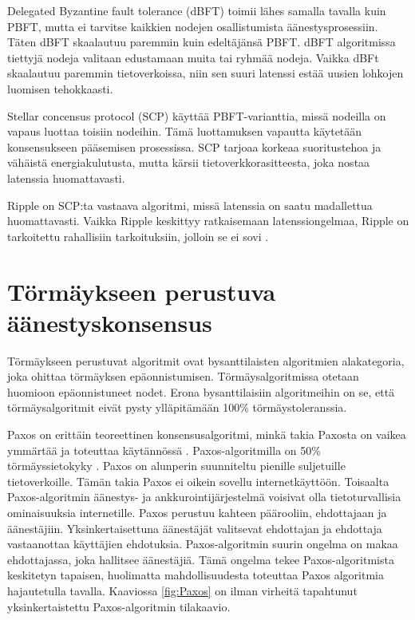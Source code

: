 \documentclass[utf8,bachelor]{gradu3}
\begin{document}
Delegated Byzantine fault tolerance (dBFT) toimii lähes samalla tavalla kuin PBFT, mutta ei tarvitse kaikkien nodejen osallistumista äänestysprosessiin. Täten dBFT skaalautuu paremmin kuin edeltäjänsä PBFT.
dBFT algoritmissa tiettyjä nodeja valitaan edustamaan muita tai ryhmää nodeja.
Vaikka dBFt skaalautuu paremmin tietoverkoissa, niin sen suuri latenssi estää uusien lohkojen luomisen tehokkaasti.

Stellar concensus protocol (SCP) käyttää PBFT-varianttia, missä nodeilla on vapaus luottaa toisiin nodeihin. Tämä luottamuksen vapautta käytetään konsensukseen pääsemisen prosessissa.
SCP tarjoaa korkeaa suoritustehoa ja vähäistä energiakulutusta, mutta kärsii tietoverkkorasitteesta, joka nostaa latenssia huomattavasti. 

Ripple on SCP:ta vastaava algoritmi, missä latenssia on saatu madallettua huomattavasti. Vaikka Ripple keskittyy ratkaisemaan latenssiongelmaa, Ripple on tarkoitettu rahallisiin tarkoituksiin, jolloin se ei sovi .

\section{Törmäykseen perustuva äänestyskonsensus}

Törmäykseen perustuvat algoritmit ovat bysanttilaisten algoritmien alakategoria, joka ohittaa törmäyksen epäonnistumisen. Törmäysalgoritmissa otetaan huomioon epäonnistuneet nodet. Erona bysanttilaisiin algoritmeihin on se, että törmäysalgoritmit eivät pysty ylläpitämään 100\% törmäystoleranssia.

Paxos on erittäin teoreettinen konsensusalgoritmi, minkä takia Paxosta on vaikea ymmärtää ja toteuttaa käytännössä \parencite{andrey2019review}.
Paxos-algoritmilla on 50\% törmäyssietokyky \parencite{panda2019study}.
Paxos on alunperin suunniteltu pienille suljetuille tietoverkoille. Tämän takia Paxos ei oikein sovellu internetkäyttöön.
Toisaalta Paxos-algoritmin äänestys- ja ankkurointijärjestelmä voisivat olla tietoturvallisia ominaisuuksia internetille. 
Paxos perustuu kahteen päärooliin, ehdottajaan ja äänestäjiin. Yksinkertaisettuna äänestäjät valitsevat ehdottajan ja ehdottaja vastaanottaa käyttäjien ehdotuksia.
Paxos-algoritmin suurin ongelma on makaa ehdottajassa, joka hallitsee äänestäjiä. Tämä ongelma tekee Paxos-algoritmista keskitetyn tapaisen, huolimatta mahdollisuudesta toteuttaa Paxos algoritmia hajautetulla tavalla. Kaaviossa \ref{fig:Paxos} on ilman virheitä tapahtunut yksinkertaistettu Paxos-algoritmin tilakaavio.
\end{document}
